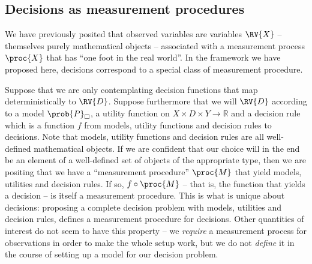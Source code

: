 

\subsection{Decisions as measurement procedures}

We have previously posited that observed variables are variables $\RV{X}$ -- themselves purely mathematical objects -- associated with a measurement process $\proc{X}$ that has ``one foot in the real world''. In the framework we have proposed here, decisions correspond to a special class of measurement procedure.

Suppose that we are only contemplating decision functions that map deterministically to $\RV{D}$. Suppose furthermore that we will $\RV{D}$ according to a model $\prob{P}_\square$, a utility function on $X\times D\times Y\to \mathbb{R}$ and a decision rule which is a function $f$ from models, utility functions and decision rules to decisions. Note that models, utility functions and decision rules are all well-defined mathematical objects. If we are confident that our choice will in the end be an element of a well-defined set of objects of the appropriate type, then we are positing that we have a ``measurement procedure'' $\proc{M}$ that yield models, utilities and decision rules. If so, $f\circ \proc{M}$ -- that is, the function that yields a decision -- is itself a measurement procedure. This is what is unique about decisions: proposing a complete decision problem with models, utilities and decision rules, defines a measurement procedure for decisions. Other quantities of interest do not seem to have this property -- we \emph{require} a measurement process for observations in order to make the whole setup work, but we do not \emph{define} it in the course of setting up a model for our decision problem.


